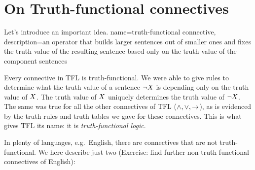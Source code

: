 \section{On Truth-functional connectives}
\label{s:TruthFunctionality}

Let's introduce an important idea.
{
	name=truth-functional connective,
	description={an operator that builds larger sentences out of smaller ones and fixes the \gls{truth value} of the resulting sentence based only on the truth value of the component sentences}
}

Every connective in TFL is truth-functional. We were able to give rules to determine what the truth value of a sentence $\neg X$ is depending only on the truth value of $X$. The truth value of $X$ uniquely determines the truth value of $\neg X$. The same was true for all the other connectives of TFL ($\mathbin{\wedge},\vee,\rightarrow$), as is evidenced by the truth rules and truth tables we gave for these connectives. This is what gives TFL its name: it is \emph{truth-functional logic}.






In plenty of languages, e.g.~English, there are connectives that are not truth-functional. We here describe just two (Exercise: find further non-truth-functional connectives of English):

